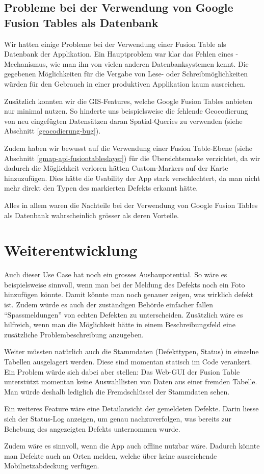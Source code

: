 \subsection{Probleme bei der Verwendung von Google Fusion Tables als Datenbank}
Wir hatten einige Probleme bei der Verwendung einer Fusion Table als Datenbank der Applikation. Ein Hauptproblem war klar das Fehlen eines -Mechanismus, wie man ihn von vielen anderen Datenbanksystemen kennt. Die gegebenen Möglichkeiten für die Vergabe von Lese- oder Schreibmöglichkeiten würden für den Gebrauch in einer produktiven Applikation kaum ausreichen.

Zusätzlich konnten wir die \gls{GIS}-Features, welche Google Fusion Tables anbieten nur minimal nutzen. So hinderte uns beispielsweise die fehlende \gls{Geocodierung} von neu eingefügten Datensätzen daran Spatial-Queries zu verwenden (siehe Abschnitt \ref{geocodierung-bug}).

Zudem haben wir bewusst auf die Verwendung einer Fusion Table-Ebene (siehe Abschnitt \ref{gmap-api-fusiontableslayer}) für die Übersichtsmaske verzichtet, da wir dadurch die Möglichkeit verloren hätten Custom-Markers auf der Karte hinzuzufügen. Dies hätte die Usability der App stark verschlechtert, da man nicht mehr direkt den Typen des markierten Defekts erkannt hätte.

Alles in allem waren die Nachteile bei der Verwendung von Google Fusion Tables als Datenbank wahrscheinlich grösser als deren Vorteile.

\section{Weiterentwicklung}
Auch dieser Use Case hat noch ein grosses Ausbaupotential. So wäre es beispielsweise sinnvoll, wenn man bei der Meldung des Defekts noch ein Foto hinzufügen könnte. Damit könnte man noch genauer zeigen, was wirklich defekt ist. Zudem würde es auch der zuständigen Behörde einfacher fallen "`Spassmeldungen"' von echten Defekten zu unterscheiden. Zusätzlich wäre es hilfreich, wenn man die Möglichkeit hätte in einem Beschreibungsfeld eine zusätzliche Problembeschreibung anzugeben.

Weiter müssten natürlich auch die Stammdaten (Defekttypen, Status) in einzelne Tabellen ausgelagert werden. Diese sind momentan statisch im Code verankert. Ein Problem würde sich dabei aber stellen: Das Web-GUI der Fusion Table unterstützt momentan keine Auswahllisten von Daten aus einer fremden Tabelle. Man würde deshalb lediglich die Fremdschlüssel der Stammdaten sehen.

Ein weiteres Feature wäre eine Detailansicht der gemeldeten Defekte. Darin liesse sich der Status-Log anzeigen, um genau nachzuverfolgen, was bereits zur Behebung des angezeigten Defekts unternommen wurde. 

Zudem wäre es sinnvoll, wenn die App auch offline nutzbar wäre. Dadurch könnte man Defekte auch an Orten melden, welche über keine ausreichende Mobilnetzabdeckung verfügen.
